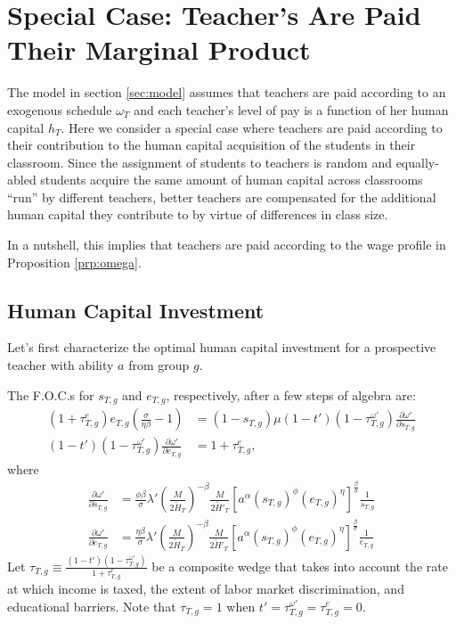 \documentclass[onehalfspacing,11pt]{article}
\begin{document}
	\section{Special Case: Teacher's Are Paid Their Marginal Product}\label{app:equilibrium}
	The model in section \ref{sec:model} assumes that teachers are paid according to an exogenous schedule $\omega_T$ and each teacher's level of pay is a function of her human capital $h_T$. Here we consider a special case where teachers are paid according to their contribution to the human capital acquisition of the students in their classroom. Since the assignment of students to teachers is random and equally-abled students acquire the same amount of human capital across classrooms ``run'' by different teachers, better teachers are compensated for the additional human capital they contribute to by virtue of differences in class size.
	
	In a nutshell, this implies that teachers are paid according to the wage profile in Proposition \ref{prp:omega}.
	\subsection{Human Capital Investment}
	Let's first characterize the optimal human capital investment for a prospective teacher with ability $a$ from group $g$.%
	
	The F.O.C.s for $s_{T,g}$ and $e_{T,g}$, respectively, after a few steps of algebra are:
	\begin{align}
		\label{eq:foc-e}
		(1+\tau^e_{T,g}) e_{T,g} \left( \frac{\sigma}{\eta\beta }-1 \right) & = \left(1-s_{T,g}\right) \mu(1-t')(1-\tau^{\omega '}_{T,g}) \frac{\partial \omega'}{\partial s_{T,g}} \\
		\label{eq:foc-s}
		(1-t')(1-\tau^{\omega '}_{T,g}) \frac{\partial \omega'}{\partial e_{T,g}} & = 1+\tau^e_{T,g},
	\end{align}
	where
	\begin{align}
		\frac{\partial \omega'}{\partial s_{T,g}} & =  \frac{\phi\beta }{\sigma} \lambda' \left(\frac{M}{2 \widetilde{H}_T}\right)^{-\beta} \frac{M}{2 {\widetilde{H}'_T}} \left[ a^\alpha (s_{T,g})^\phi (e_{T,g})^\eta \right]^{\frac{\beta}{\sigma}} \frac{1}{s_{T,g}} \label{eq:sT} \\
		\frac{\partial \omega'}{\partial e_{T,g}} & = \frac{\eta\beta }{\sigma} \lambda' \left(\frac{M}{2 \widetilde{H}_T}\right)^{-\beta} \frac{M}{2 {\widetilde{H}'_T}} \left[ a^\alpha (s_{T,g})^\phi (e_{T,g})^\eta \right]^{\frac{\beta}{\sigma}} \frac{1}{e_{T,g}} \label{eq:eT}
	\end{align}
	Let $\tau_{T,g} \equiv \frac{\left( 1-t' \right) \left( 1-\tau^{\omega '}_{T,g} \right)}{1+\tau^e_{T,g}}$ be a composite wedge that takes into account the rate at which income is taxed, the extent of labor market discrimination, and educational barriers. Note that $\tau_{T,g}=1$ when $t' = \tau^{\omega '}_{T,g} = \tau^e_{T,g} = 0$.
	
\end{document}
